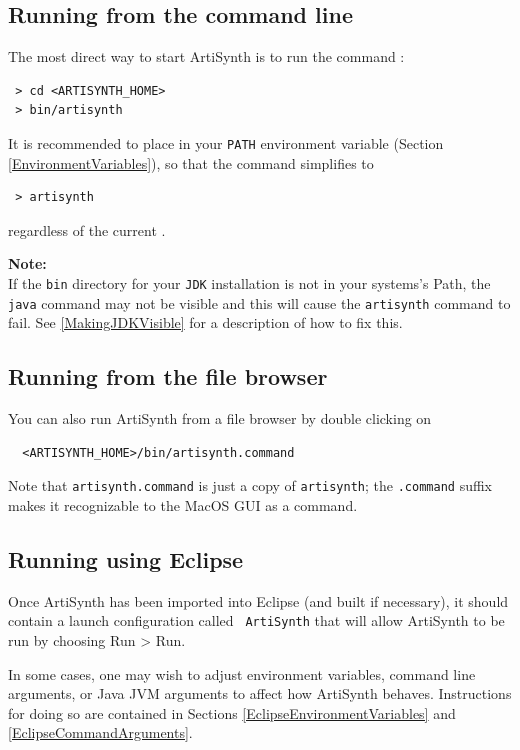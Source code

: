 \else %
\subsection{Running from the command line}
\label{artisynthCommandLine}

The most direct way to start ArtiSynth is to run the command
:
%
\begin{verbatim}
 > cd <ARTISYNTH_HOME>
 > bin/artisynth
\end{verbatim}
It is recommended to place \ArtHome[/bin] in your {\tt PATH}
environment variable (Section \ref{EnvironmentVariables}), so
that the command simplifies to
\begin{verbatim}
 > artisynth
\end{verbatim}
regardless of the current \directory{}.

\begin{sideblock}
{\bf Note:}\\ If the {\tt bin} directory for your {\tt JDK}
installation is not in your systems's Path, the {\tt java} command may
not be visible and this will cause the {\tt artisynth} command to fail.
See \ref{MakingJDKVisible} for a description of how to fix this.
\end{sideblock}

\ifMacOS
\subsection{Running from the file browser}

You can also run ArtiSynth from a file browser by double clicking on
\begin{verbatim}
  <ARTISYNTH_HOME>/bin/artisynth.command
\end{verbatim}
Note that {\tt artisynth.command} is just a copy of {\tt artisynth};
the {\tt .command} suffix makes it recognizable to the MacOS GUI as a
command.
\fi %
\fi %

\subsection{Running using Eclipse}

Once ArtiSynth has been imported into Eclipse (and built if
necessary), it should contain a launch configuration called {\tt
ArtiSynth} that will allow ArtiSynth to be run by choosing {\sf Run >
Run}.

In some cases, one may wish to adjust environment variables, command
line arguments, or Java JVM arguments to affect how ArtiSynth behaves.
Instructions for doing so are contained in Sections
\ref{EclipseEnvironmentVariables} and \ref{EclipseCommandArguments}.

